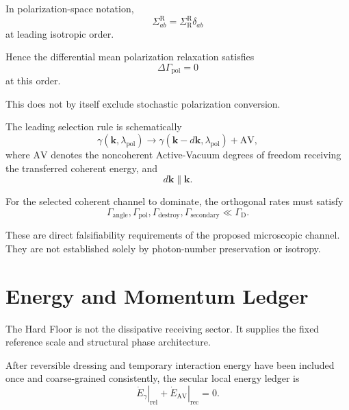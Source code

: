 In polarization-space notation,
\begin{equation}
    \boxed{
    \Sigma_{ab}^{\mathrm R}
    =
    \Sigma_{\mathrm R}^{\mathrm R}
    \delta_{ab}
    }
    \label{eq:AQ_pol_selfenergy}
\end{equation}
at leading isotropic order.

Hence the differential mean polarization relaxation satisfies
\begin{equation}
    \boxed{
    \Delta\Gamma_{\mathrm{pol}}
    =
    0
    }
    \label{eq:AQ_pol_zero}
\end{equation}
at this order.

This does not by itself exclude stochastic polarization conversion.

The leading selection rule is schematically
\begin{equation}
    \boxed{
    \gamma(
        \mathbf{k},
        \lambda_{\mathrm{pol}}
    )
    \rightarrow
    \gamma(
        \mathbf{k}-d\mathbf{k},
        \lambda_{\mathrm{pol}}
    )
    +
    \mathrm{AV},
    }
    \label{eq:AQ_selection}
\end{equation}
where $\mathrm{AV}$ denotes the noncoherent Active-Vacuum degrees of freedom
receiving the transferred coherent energy, and
\begin{equation}
    d\mathbf{k}
    \parallel
    \mathbf{k}.
\end{equation}

For the selected coherent channel to dominate, the orthogonal rates must
satisfy
\begin{equation}
    \boxed{
    \Gamma_{\mathrm{angle}},
    \Gamma_{\mathrm{pol}},
    \Gamma_{\mathrm{destroy}},
    \Gamma_{\mathrm{secondary}}
    \ll
    \Gamma_{\mathrm D}.
    }
    \label{eq:AQ_suppression_requirements}
\end{equation}

These are direct falsifiability requirements of the proposed microscopic
channel. They are not established solely by photon-number preservation or
isotropy.


\section{Energy and Momentum Ledger}

The Hard Floor is not the dissipative receiving sector. It supplies the fixed
reference scale and structural phase architecture.

After reversible dressing and temporary interaction energy have been included
once and coarse-grained consistently, the secular local energy ledger is
\begin{equation}
    \boxed{
    \left.\dot E_{\gamma}\right|_{\mathrm{rel}}
    +
    \left.\dot E_{\mathrm{AV}}\right|_{\mathrm{rec}}
    =
    0.
    }
    \label{eq:AQ_energy_conservation}
\end{equation}

